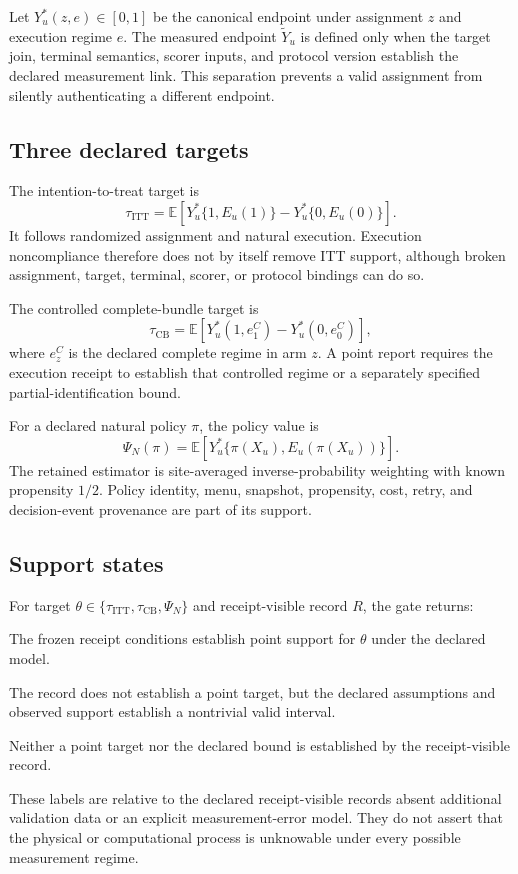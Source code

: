 \documentclass{article}
\newcommand{\E}{\mathbb{E}}
\newcommand{\cert}{\textsc{Certified}\xspace}
\newcommand{\bounded}{\textsc{Bounded}\xspace}
\newcommand{\notcert}{\textsc{Not-Certified}\xspace}
\newcommand{\tightlist}{\setlength{\itemsep}{2pt}\setlength{\parskip}{0pt}}
\begin{document}
Let $Y_u^*(z,e)\in[0,1]$ be the canonical endpoint under assignment $z$ and execution regime $e$. The measured endpoint $\widetilde Y_u$ is defined only when the target join, terminal semantics, scorer inputs, and protocol version establish the declared measurement link. This separation prevents a valid assignment from silently authenticating a different endpoint.

\subsection{Three declared targets}

The intention-to-treat target is
\begin{equation}
  \tau_{\mathrm{ITT}}
  = \E\!\left[Y_u^*\{1,E_u(1)\}-Y_u^*\{0,E_u(0)\}\right].
  \label{eq:itt}
\end{equation}
It follows randomized assignment and natural execution. Execution noncompliance therefore does not by itself remove ITT support, although broken assignment, target, terminal, scorer, or protocol bindings can do so.

The controlled complete-bundle target is
\begin{equation}
  \tau_{\mathrm{CB}}
  = \E\!\left[Y_u^*(1,e_1^C)-Y_u^*(0,e_0^C)\right],
  \label{eq:cb}
\end{equation}
where $e_z^C$ is the declared complete regime in arm $z$. A point report requires the execution receipt to establish that controlled regime or a separately specified partial-identification bound.

For a declared natural policy $\pi$, the policy value is
\begin{equation}
  \Psi_N(\pi)=\E\!\left[Y_u^*\{\pi(X_u),E_u(\pi(X_u))\}\right].
  \label{eq:policy}
\end{equation}
The retained estimator is site-averaged inverse-probability weighting with known propensity $1/2$. Policy identity, menu, snapshot, propensity, cost, retry, and decision-event provenance are part of its support.

\subsection{Support states}

For target $\theta\in\{\tau_{\mathrm{ITT}},\tau_{\mathrm{CB}},\Psi_N\}$ and receipt-visible record $R$, the gate returns:
\begin{description}
\tightlist
\item[\cert.] The frozen receipt conditions establish point support for $\theta$ under the declared model.
\item[\bounded.] The record does not establish a point target, but the declared assumptions and observed support establish a nontrivial valid interval.
\item[\notcert.] Neither a point target nor the declared bound is established by the receipt-visible record.
\end{description}
These labels are relative to the declared receipt-visible records absent additional validation data or an explicit measurement-error model. They do not assert that the physical or computational process is unknowable under every possible measurement regime.
\end{document}
